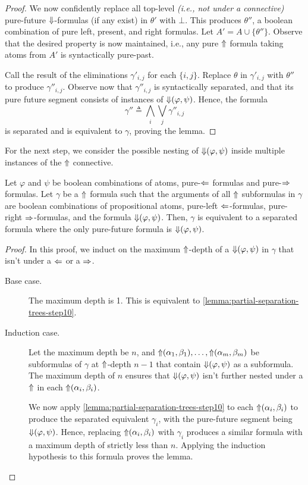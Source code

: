\documentclass[a4paper,UKenglish,cleveref, autoref, thm-restate, numberwithinsect]{lipics-v2021}
\def\Larrow{\ensuremath\mathord{\Leftarrow}}
\def\Rarrow{\ensuremath\mathord{\Rightarrow}}
\def\Uarrow{\ensuremath\mathord{\Uparrow}}
\def\Darrow{\ensuremath\mathord{\Downarrow}}
\begin{document}
\begin{proof}
    We now confidently replace all top-level \textit{(i.e., not under a connective)} pure-future $\Darrow$-formulas (if any exist) in $\theta'$ with $\bot$. This produces $\theta''$, a boolean combination of pure left, present, and right formulas. Let $A' = A \cup \{\theta''\}$. Observe that the desired property is now maintained, i.e., any pure $\Uarrow$ formula taking atoms from $A'$ is syntactically pure-past.

    Call the result of the eliminations $\gamma'_{i, j}$ for each $\{i, j\}$. Replace $\theta$ in $\gamma'_{i, j}$ with $\theta''$ to produce $\gamma''_{i, j}$. Observe now that $\gamma''_{i, j}$ is syntactically separated, and that its pure future segment consists of instances of $\Darrow(\varphi, \psi)$. Hence, the formula
    \begin{equation*}
        \gamma'' \triangleq \bigwedge_i \bigvee_j \gamma''_{i, j}
    \end{equation*}
    is separated and is equivalent to $\gamma$, proving the lemma.
\end{proof}
For the next step, we consider the possible nesting of $\Darrow(\varphi, \psi)$ inside multiple instances of the $\Uarrow$ connective.
\begin{lemma}
    \label{lemma:partial-separation-trees-step11}
    Let $\varphi$ and $\psi$ be boolean combinations of atoms, pure-$\Larrow$ formulas and pure-$\Rarrow$ formulas. Let $\gamma$ be a $\Uarrow$ formula such that the arguments of all $\Uarrow$ subformulas in $\gamma$ are boolean combinations of propositional atoms, pure-left $\Larrow$-formulas, pure-right $\Rarrow$-formulas, and the formula $\Darrow(\varphi, \psi)$. Then, $\gamma$ is equivalent to a separated formula where the only pure-future formula is $\Darrow(\varphi, \psi)$.
\end{lemma}
\begin{proof}
    In this proof, we induct on the maximum $\Uarrow$-depth of a $\Darrow(\varphi, \psi)$ in $\gamma$ that isn't under a $\Larrow$ or a $\Rarrow$.

    \begin{description}
        \item[Base case.] The maximum depth is 1. This is equivalent to \cref{lemma:partial-separation-trees-step10}.
        \item[Induction case.] Let the maximum depth be $n$, and $\Uarrow(\alpha_1, \beta_1), \ldots, \Uarrow(\alpha_m, \beta_m)$ be subformulas of $\gamma$ at $\Uarrow$-depth $n-1$ that contain $\Darrow(\varphi, \psi)$ as a subformula. The maximum depth of $n$ ensures that $\Darrow(\varphi, \psi)$ isn't further nested under a $\Uarrow$ in each $\Uarrow(\alpha_i, \beta_i)$.

        We now apply \cref{lemma:partial-separation-trees-step10} to each $\Uarrow(\alpha_i, \beta_i)$ to produce the separated equivalent $\gamma_i$, with the pure-future segment being $\Darrow(\varphi, \psi)$. Hence, replacing $\Uarrow(\alpha_i, \beta_i)$ with $\gamma_i$ produces a similar formula with a maximum depth of strictly less than $n$. Applying the induction hypothesis to this formula proves the lemma.
    \end{description}
\end{proof}
\end{document}
